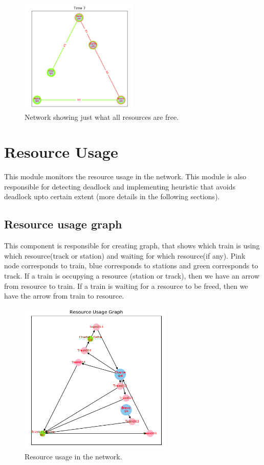 \begin{figure}[H]
    \centering
    \includegraphics[width=0.5\textwidth]{graph2}
    \caption{ Network showing just what all resources are free.  }
    \label{image-myimage6}
\end{figure}

\section{Resource Usage}

This module monitors the resource usage in the network. This module is also responsible for detecting deadlock and 
implementing heuristic that avoids deadlock upto certain extent (more details in the following sections). 
  
\subsection{Resource usage graph}
This component is responsible 
for creating graph, that shows which train is using which resource(track or station) and waiting for 
which resource(if any). Pink node corresponds to train, blue corresponds to stations and green corresponds 
to track. If a train is occupying a resource (station or track), then we have an arrow from resource to train.
If a train is waiting for a resource to be freed, then we have the arrow from train to resource.

\begin{figure}[h]
    \centering
    \includegraphics[width=0.65\textwidth]{resource}
    \caption{ Resource usage in the network.  }
    \label{image-myimage6}
\end{figure}


